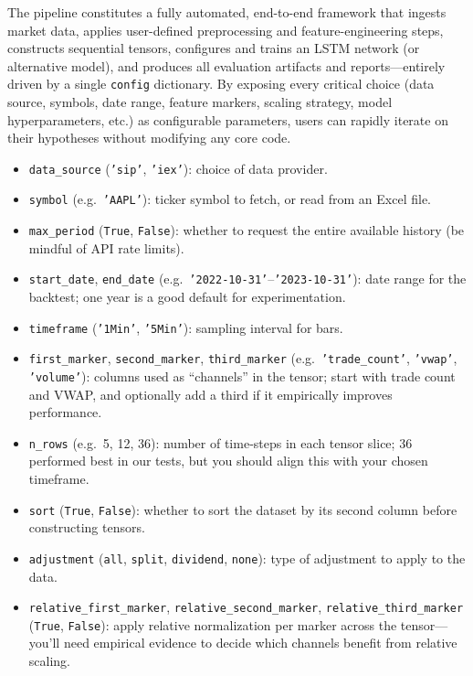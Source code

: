 \documentclass[letterpaper]{article}
\begin{document}
The pipeline constitutes a fully automated, end-to-end framework that ingests market data, applies user-defined preprocessing and feature-engineering steps, constructs sequential tensors, configures and trains an LSTM network (or alternative model), and produces all evaluation artifacts and reports—entirely driven by a single \texttt{config} dictionary.  By exposing every critical choice (data source, symbols, date range, feature markers, scaling strategy, model hyperparameters, etc.) as configurable parameters, users can rapidly iterate on their hypotheses without modifying any core code.

\begin{itemize}[left=0pt]
       \item \texttt{data\_source} (\texttt{'sip'}, \texttt{'iex'}): choice of data provider.
       \item \texttt{symbol} (e.g.\ \texttt{'AAPL'}): ticker symbol to fetch, or read from an Excel file.
       \item \texttt{max\_period} (\texttt{True}, \texttt{False}): whether to request the entire available history (be mindful of API rate limits).
       \item \texttt{start\_date}, \texttt{end\_date} (e.g.\ \texttt{'2022-10-31'}–\texttt{'2023-10-31'}): date range for the backtest; one year is a good default for experimentation.
       \item \texttt{timeframe} (\texttt{'1Min'}, \texttt{'5Min'}): sampling interval for bars.
       \item \texttt{first\_marker}, \texttt{second\_marker}, \texttt{third\_marker} (e.g.\ \texttt{'trade\_count'}, \texttt{'vwap'}, \texttt{'volume'}): columns used as “channels” in the tensor; start with trade count and VWAP, and optionally add a third if it empirically improves performance.
       \item \texttt{n\_rows} (e.g.\ 5, 12, 36): number of time‑steps in each tensor slice; 36 performed best in our tests, but you should align this with your chosen timeframe.
       \item \texttt{sort} (\texttt{True}, \texttt{False}): whether to sort the dataset by its second column before constructing tensors.
       \item \texttt{adjustment} (\texttt{all}, \texttt{split}, \texttt{dividend}, \texttt{none}): type of adjustment to apply to the data.
       \item \texttt{relative\_first\_marker}, \texttt{relative\_second\_marker}, \texttt{relative\_third\_marker} (\texttt{True}, \texttt{False}): apply relative normalization per marker across the tensor—you’ll need empirical evidence to decide which channels benefit from relative scaling.

\end{itemize}
\end{document}
